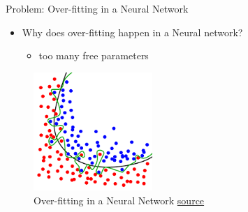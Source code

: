 \begin{frame}{Problem: Over-fitting in a Neural Network}
	\begin{itemize}
		\item Why does over-fitting happen in a Neural network?
		\begin{itemize}
			\item too many free parameters
		\end{itemize}
	\end{itemize}
    \begin{figure}[H]
        \centering
        \includegraphics[width=0.4\textwidth]{Figs/section_4/overfitting.png}
        \caption{Over-fitting in a Neural Network \href{https://en.wikipedia.org/wiki/Overfitting}{source}}
    \end{figure}
\end{frame}

